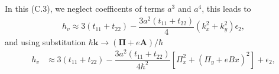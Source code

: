 \documentclass{report}
\newcommand{\f}[2]{\dfrac{#1}{#2}}
\begin{document}
In this (C.3), we neglect coefficents of terms $a^{3}$ and $a^{4}$, this leads to
\begin{gather}
	h_{v} \approx 3(t_{11} + t_{22}) - \f{3a^{2}(t_{11} + t_{22})}{4} \left(k_{x}^{2} + k_{y}^{2}\right) \epsilon_{2},
\end{gather}
and using substitution $\hbar\mathbf{k} \rightarrow (\mathbf{\Pi} + e\mathbf{A})/\hbar$
\begin{equation}
	\begin{aligned}
		h_{v}
		 & \approx 3 (t_{11} + t_{22}) - \f{3a^{2}(t_{11} + t_{22})}{4\hbar^{2}} \left[\Pi_{x}^{2} + (\Pi_{y} + eBx)^{2}\right] + \epsilon_{2}   ,                                                                        
	\end{aligned}
\end{equation}
\end{document}
